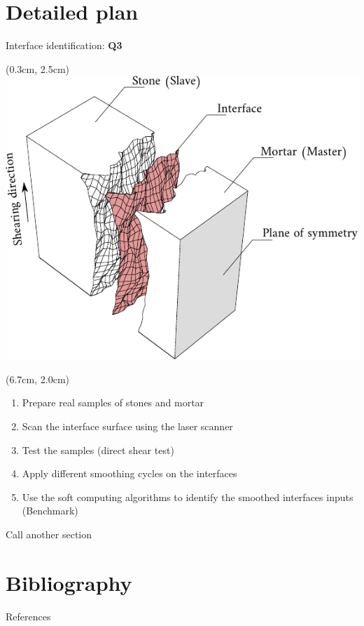 \documentclass{EESD}
\begin{document}
\section{Detailed plan}


\begin{frame}{Interface identification: \textcolor{myviolet}{\textbf{Q3}}}\vspace{4pt}
    \begin{textblock*}{10cm}(0.3cm, 2.5cm)
        \includegraphics[height = 0.5\textwidth]{Interface.pdf}
    \end{textblock*}
    \begin{textblock*}{10cm}(6.7cm, 2.0cm)
    \begin{enumerate}
    \setlength\itemsep{10pt}
        \item Prepare real samples of stones and mortar\pause
        \item Scan the interface surface using the laser scanner\pause
        \item Test the samples (direct shear test)\pause
        \item Apply different smoothing cycles on the interfaces\pause
        \item Use the soft computing algorithms to identify the smoothed interfaces inputs (Benchmark)
    \end{enumerate}
    \end{textblock*}
\end{frame}

\begin{frame}{Call another section}
    
\end{frame}

\breakingframe{
\begin{textblock*}{10cm}(3.2cm,4cm)
\Huge\textbf{\textcolor{black}{Merci de votre attention}}
\end{textblock*}
}
\section{Bibliography}
\begin{frame}{References}\vspace{4pt}
\tiny{\printbibliography}
\end{frame}
\normalsize
\end{document}
